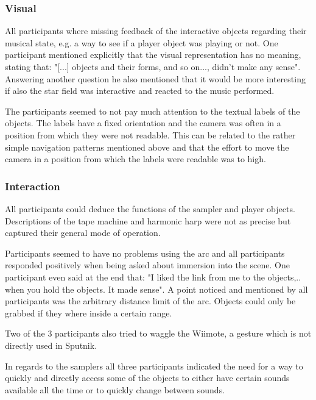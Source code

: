 \documentclass[10pt,a4paper]{scrartcl}
\begin{document}
\subsubsection{Visual}
All participants where missing feedback of the interactive objects regarding their musical state, e.g. a way to see if a player object was playing or not. One participant mentioned explicitly that the visual representation has no meaning, stating that: "[...] objects and their forms, and so on..., didn't make any sense". Answering another question he also mentioned that it would be more interesting if also the star field was interactive and reacted to the music performed.

The participants seemed to not pay much attention to the textual labels of the objects. The labels have a fixed orientation and the camera was often in a position from which they were not readable. This can be related to the rather simple navigation patterns mentioned above and that the effort to move the camera in a position from which the labels were readable was to high.



\subsubsection{Interaction}
All participants could deduce the functions of the sampler and player objects. Descriptions of the tape machine and harmonic harp were not as precise but captured their general mode of operation. 

Participants seemed to have no problems using the arc and all participants responded positively when being asked about immersion into the scene. One participant even said at the end that: "I liked the link from me to the objects,.. when you hold the objects. It made sense". A point noticed and mentioned by all participants was the arbitrary distance limit of the arc. Objects could only be grabbed if they where inside a certain range.

Two of the 3 participants also tried to waggle the Wiimote, a gesture which is not directly used in Sputnik. 
 
In regards to the samplers all three participants indicated the need for a way to quickly and directly access some of the objects to either have certain sounds available all the time or to quickly change between sounds.
\end{document}
